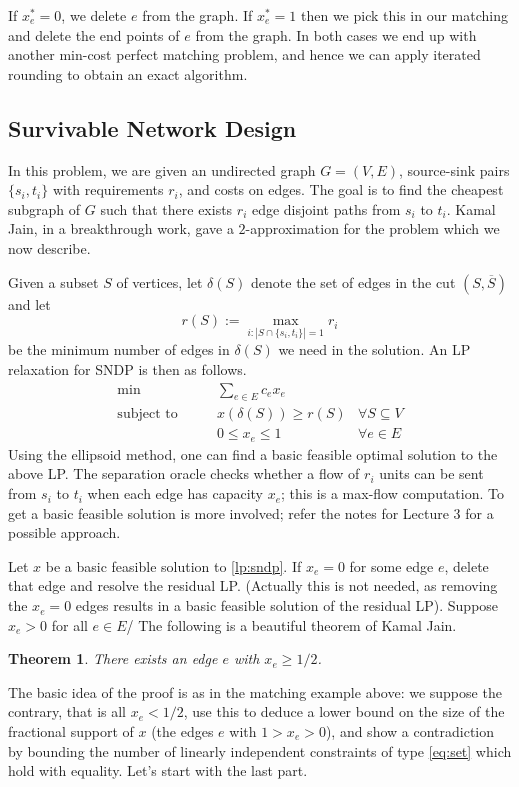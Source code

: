 \documentclass[11pt]{article}
\newtheorem{theorem}{Theorem}
\def\bar{\overline}
\begin{document}
If $x^*_e = 0$, we delete $e$ from the graph. If $x^*_e = 1$ then we pick this in our matching and delete 
the end points of $e$ from the graph. In both cases we end up with another min-cost perfect matching problem, and hence we can apply iterated rounding to obtain an exact algorithm.

\subsection*{Survivable Network Design}
In this problem, we are given an undirected graph $G=(V,E)$, source-sink pairs $\{s_i,t_i\}$ with  requirements $r_i$, and costs on edges. The goal is to find the cheapest subgraph of $G$ such that there exists $r_i$ edge disjoint paths from $s_i$ to $t_i$. Kamal Jain, in a breakthrough work, gave a $2$-approximation for the problem which we now describe.

 Given a subset $S$ of vertices, let $\delta(S)$ denote the set of edges in the cut $(S,\bar{S})$ and
let $$r(S) := \max_{i: |S\cap \{s_i,t_i\}|=1} r_i$$
be the minimum number of edges in $\delta(S)$ we need in the solution. 
An LP relaxation for  SNDP is then as follows.
\begin{align}
\min &\qquad \sum_{e\in E} c_ex_e & \label{lp:sndp} \\
\textrm{subject to} 	&\qquad x(\delta(S)) \ge r(S) & \forall S\subseteq  V \label{eq:set} \\
				&\qquad 0\le x_e \le 1 & \forall e\in E				
\end{align}
Using the ellipsoid method, one can find a basic feasible optimal solution to the above LP. 
The separation oracle checks whether a flow of $r_i$ units can be sent from $s_i$ to $t_i$ when each 
edge has capacity $x_e$; this is a max-flow computation. To get a basic feasible solution is more involved;
refer the notes for Lecture 3 for a possible approach.

Let $x$ be a basic feasible solution to \eqref{lp:sndp}. If $x_e =0$ for some edge $e$, 
delete that edge and resolve the residual LP. (Actually this is not needed, as removing the $x_e = 0$ edges
results in a basic feasible solution of the residual LP). Suppose $x_e > 0$ for all $e\in E$/
The following is a beautiful theorem of Kamal Jain.

\begin{theorem}\label{thm:jain}
There exists an edge $e$ with $x_e \ge 1/2$.
\end{theorem}

The basic idea of the proof is as in the matching example above: we suppose the contrary, that is all $x_e < 1/2$, use this to deduce a lower bound on the size of the fractional support of $x$ (the edges $e$ with $1 > x_e > 0$), and show a contradiction by bounding the number of linearly independent constraints of type \eqref{eq:set} which hold with equality. Let's start with the last part. 
\end{document}
